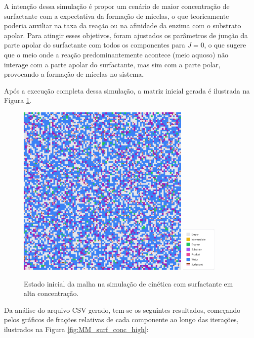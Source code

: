 \documentclass[12pt,oneside]{report}
\begin{document}
A intenção dessa simulação é propor um cenário de maior concentração de surfactante com a expectativa da formação de micelas, o que teoricamente poderia auxiliar na taxa da reação ou na afinidade da enzima com o substrato apolar. Para atingir esses objetivos, foram ajustados os parâmetros de junção da parte apolar do surfactante com todos os componentes para $J = 0$, o que sugere que o meio onde a reação predominantemente acontece (meio aquoso) não interage com a parte apolar do surfactante, mas sim com a parte polar, provocando a formação de micelas no sistema.

Após a execução completa dessa simulação, a matriz inicial gerada é ilustrada na Figura \ref{fig:MM_surf_initial_high}.

\begin{figure}[H]
    \centering
    \includegraphics[width=0.75\textwidth]{img/MM_surf_initial_high.png}
    \hspace{0.05\textwidth}
    \includegraphics[width=0.15\textwidth]{img/legend_surf.png}
    \caption{\small Estado inicial da malha na simulação de cinética com surfactante em alta concentração.}
    \label{fig:MM_surf_initial_high}
\end{figure}

Da análise do arquivo CSV gerado, tem-se os seguintes resultados, começando pelos gráficos de frações relativas de cada componente ao longo das iterações, ilustrados na Figura \ref{fig:MM_surf_conc_high}:
\end{document}
